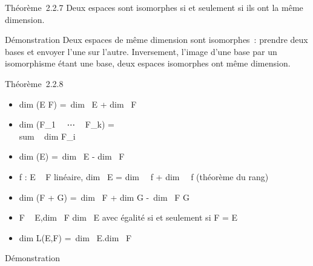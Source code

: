 \documentclass[]{article}
\begin{document}
Théorème~2.2.7 Deux espaces sont isomorphes si et seulement si ils ont
la même dimension.

Démonstration Deux espaces de même dimension sont isomorphes~: prendre
deux bases et envoyer l'une sur l'autre. Inversement, l'image d'une base
par un isomorphisme étant une base, deux espaces isomorphes ont même
dimension.

Théorème~2.2.8

\begin{itemize}
\itemsep1pt\parskip0pt
\item
  dim (E \times F) =\ dim~
  E + dim~ F
\item
  dim (F\_1~
  \oplus~⋯ \oplus~ F\_k)
  = \\sum ~
  dim F\_i~
\item
   dim (E\diagupF) =\ dim~ E
  - dim~ F
\item
  f : E \rightarrow~ F linéaire, dim~ E
  = dim~
  \mathrmKer~f
  + dim~
  \mathrmIm~f (théorème du
  rang)
\item
  dim (F + G) =\ dim~
  F + dim G -\ dim~ F
  \bigcap G
\item
  F \subset~ E,\quad dim~ F
  \leq dim~ E avec égalité si et seulement si F =
  E
\item
  dim L(E,F) =\ dim~
  E.dim~ F
\end{itemize}

Démonstration
\end{document}
